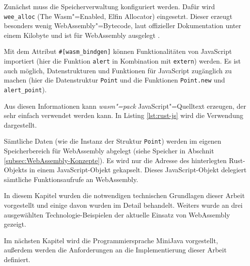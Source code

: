 Zunächst muss die Speicherverwaltung konfiguriert werden. Dafür wird \lstinline{wee_alloc} (The Wasm"=Enabled, Elfin Allocator) eingesetzt. Dieser erzeugt besonders wenig WebAssembly"=Bytecode, laut offizieller Dokumentation unter einem Kilobyte und ist für WebAssembly ausgelegt \cite{WeeAlloc}.

Mit dem Attribut \lstinline{#[wasm_bindgen]} können Funktionalitäten von JavaScript importiert (hier die Funktion \lstinline{alert} in Kombination mit \lstinline{extern}) werden. Es ist auch möglich, Datenstrukturen und Funktionen für JavaScript zugänglich zu machen (hier die Datenstruktur \lstinline{Point} und die Funktionen \lstinline{Point.new} und \lstinline{alert_point}).

Aus diesen Informationen kann \emph{wasm"=pack} JavaScript"=Quelltext erzeugen, der sehr einfach verwendet werden kann. In Listing \ref{lst:rust-js} wird die Verwendung dargestellt. 



Sämtliche Daten (wie die Instanz der Struktur \lstinline{Point}) werden im eigenen Speicherbereich für WebAssembly abgelegt (siehe Speicher in Abschnit \ref{subsec:WebAssembly-Konzepte}). Es wird nur die Adresse des hinterlegten Rust-Objekts in einem JavaScript-Objekt gekapselt. Dieses JavaScript-Objekt delegiert sämtliche Funktionsaufrufe an WebAssembly.

\vspace{4em}
In diesem Kapitel wurden die notwendigen technischen Grundlagen dieser Arbeit vorgestellt und einige davon wurden im Detail behandelt. Weiters wurde an drei ausgewählten Technologie-Beispielen der aktuelle Einsatz von WebAssembly gezeigt.

Im nächsten Kapitel wird die Programmiersprache MiniJava vorgestellt, außerdem werden die Anforderungen an die Implementierung dieser Arbeit definiert.